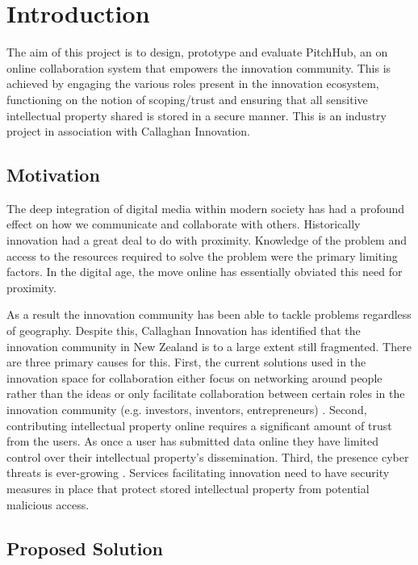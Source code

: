 \chapter{Introduction}
The aim of this project is to design, prototype and evaluate PitchHub, an on online collaboration system that empowers the innovation community. This is achieved by engaging the various roles present in the innovation ecosystem, functioning on the notion of scoping/trust and ensuring that all sensitive intellectual property shared is stored in a secure manner. This is an industry project in association with Callaghan Innovation.


\section{Motivation}
The deep integration of digital media within modern society has had a profound effect on how we communicate and collaborate with others. Historically innovation had a great deal to do with proximity. Knowledge of the problem and access to the resources required to solve the problem were the primary limiting factors. In the digital age, the move online has essentially obviated this need for proximity. 

As a result the innovation community has been able to tackle problems regardless of geography. Despite this, Callaghan Innovation has identified that the innovation community in New Zealand is to a large extent still fragmented. There are three primary causes for this.
First, the current solutions used in the innovation space for collaboration either focus on networking around people rather than the ideas \cite{Linkedin:online}\cite{Googlegroups:online} or only facilitate collaboration between certain roles in the innovation community (e.g. investors, inventors, entrepreneurs) \cite{100open:online}\cite{Pledge:online}\cite{Angel:online}\cite{Quirky:online}. Second, contributing intellectual property online requires a significant amount of trust from the users. As once a user has submitted data online they have limited control over their intellectual property's dissemination. Third, the presence cyber threats is ever-growing \cite{Cybersecurity:online}. Services facilitating innovation need to have security measures in place that protect stored intellectual property from potential malicious access.

\section{Proposed Solution}\label{S:projectObjectives}

